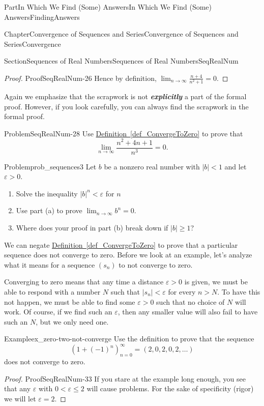 \documentclass[oneside,10pt,]{book}
\newcommand{\xreffont}{\relax}
\newcommand{\alert}[1]{\textbf{\textit{#1}}}
\numberwithin{equation}{part}
\newcommand{\abs}[1]{\left|#1\right|}
\def\limit#1#2#3{{\displaystyle\lim_{#1\rightarrow #2}#3}}
\newcommand{\eps}{\varepsilon}
\newcommand{\lt}{<}
\begin{document}
\begin{partptx}{Part}{In Which We Find (Some) Answers}{}{In Which We Find (Some) Answers}{}{}{FindingAnswers}
\begin{chapterptx}{Chapter}{Convergence of Sequences and Series}{}{Convergence of Sequences and Series}{}{}{Convergence}
\begin{sectionptx}{Section}{Sequences of Real Numbers}{}{Sequences of Real Numbers}{}{}{SeqRealNum}
\begin{proof}{Proof}{}{SeqRealNum-26}
Hence by definition, \(\limit{n}{\infty}{\frac{n+4}{n^2+1}}=0\).%
\end{proof}
Again we emphasize that the scrapwork is not \alert{explicitly} a part of the formal proof.  However, if you look carefully, you can always find the scrapwork in the formal proof.%
\begin{problem}{Problem}{}{SeqRealNum-28}%
Use \hyperref[def_ConvergeToZero]{Definition~{\xreffont\ref{def_ConvergeToZero}}}  to prove that%
\begin{equation*}
\limit{n}{\infty}{\frac{n^2+4n+1}{n^3}}=0.
\end{equation*}
%
\end{problem}
\begin{problem}{Problem}{}{prob_sequences3}%
Let \(b\) be a nonzero real number with \(|b|\lt 1\) and let \(\eps>0\).%
\begin{enumerate}[font=\bfseries,label=(\alph*),ref=\alph*]%
\item{}Solve the inequality \(|b|^n\lt \eps\) for \(n\)%
\item{}Use part (a) to prove \(\limit{n}{\infty}{b^n}=0\).%
\item{}Where does your proof in part (b) break down if \(\abs{b}\ge 1\)?%
\end{enumerate}%
\end{problem}
We can negate \hyperref[def_ConvergeToZero]{Definition~{\xreffont\ref{def_ConvergeToZero}}} to prove that a particular sequence does not converge to zero. Before we look at an example, let's analyze what it means for a sequence \(\left(s_n\right)\) to not converge to zero.%
\par
Converging to zero means that any time a distance \(\eps>0\) is given, we must be able to respond with a number \(N\) such that \(|s_n|\lt \eps\) for every \(n>N\).  To have this not happen, we must be able to find some \(\eps>0\) such that no choice of \(N\) will work.  Of course, if we find such an \(\eps\), then any smaller value will also fail to have such an \(N\), but we only need one.%
\begin{example}{Example}{}{ex_zero-two-not-converge}%
Use the definition to prove that the sequence%
\begin{equation*}
\left(1+(-1)^n\right)_{n=0}^\infty=(2,0,2,0,2,\ldots)
\end{equation*}
does not converge to zero.%
\end{example}
\begin{proof}{Proof}{}{SeqRealNum-33}
If you stare at the example long enough, you see that any \(\eps\) with \(0\lt \eps\leq 2\) will cause problems. For the sake of specificity (rigor) we will let \(\eps=2\).%

\end{proof}
\end{sectionptx}
\end{chapterptx}
\end{partptx}
\end{document}
